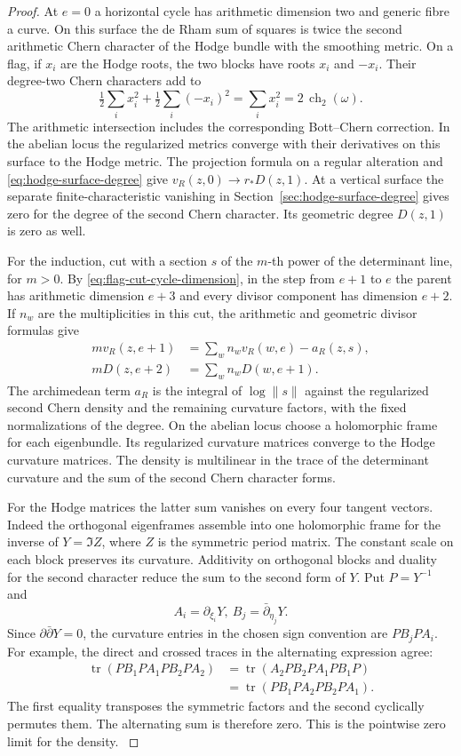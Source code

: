 \begin{proof}
At \(e=0\) a horizontal cycle has arithmetic dimension two and
generic fibre a curve. On this surface the de Rham sum of squares is
twice the second arithmetic Chern character of the
Hodge bundle with the smoothing metric. On a flag, if \(x_i\) are the Hodge roots, the two blocks have
roots \(x_i\) and \(-x_i\). Their degree-two Chern characters add to
\[
 \tfrac12\sum_i x_i^2+\tfrac12\sum_i(-x_i)^2
 =\sum_i x_i^2=2\,\operatorname{ch}_2(\omega).
\]
The arithmetic intersection includes the corresponding Bott--Chern correction. In the abelian locus the
regularized metrics converge with their derivatives on
this surface to the Hodge metric. The projection
formula on a regular alteration and
\eqref{eq:hodge-surface-degree} give
\(v_R(z,0)\to r_*D(z,1)\). At a vertical surface the
separate finite-characteristic vanishing in
Section~\ref{sec:hodge-surface-degree} gives zero for
the degree of the second Chern character. Its geometric
degree \(D(z,1)\) is zero as well.

For the induction, cut with a section \(s\) of the
\(m\)-th power of the determinant line, for \(m>0\).
By \eqref{eq:flag-cut-cycle-dimension}, in the step from \(e+1\) to \(e\) the parent has arithmetic
dimension \(e+3\) and every divisor component has dimension \(e+2\).
If \(n_w\) are the multiplicities in this cut,
the arithmetic and geometric divisor formulas give
\[
 \begin{split}
 m v_R(z,e+1)&=\sum_w n_w v_R(w,e)-a_R(z,s),\\
 m D(z,e+2)&=\sum_w n_w D(w,e+1).
 \end{split}
\]
The archimedean term \(a_R\) is the integral of
\(\log\|s\|\) against the regularized second Chern density
and the remaining curvature factors, with the fixed
normalizations of the degree. On the abelian locus choose a
holomorphic frame for each eigenbundle. Its regularized
curvature matrices converge to the Hodge curvature matrices.
The density is multilinear in the trace of the determinant
curvature and the sum of the second Chern character forms.

For the Hodge matrices the latter sum vanishes on every four
tangent vectors. Indeed the orthogonal eigenframes assemble into
one holomorphic frame for the inverse of \(Y=\Im Z\), where
\(Z\) is the symmetric period matrix. The constant scale on
each block preserves its curvature. Additivity on orthogonal
blocks and duality for the second character reduce the sum to
the second form of \(Y\). Put \(P=Y^{-1}\) and
\[
 A_i=\partial_{\xi_i}Y,\ B_j=\bar\partial_{\eta_j}Y.
\]
Since
\(\partial\bar\partial Y=0\), the curvature entries in the
chosen sign convention are \(P B_j P A_i\). For example, the direct and crossed traces in the alternating
expression agree:
\[
\begin{aligned}
 \operatorname{tr}(P B_1 P A_1 P B_2 P A_2)
 &=\operatorname{tr}(A_2 P B_2 P A_1 P B_1 P)\\
 &=\operatorname{tr}(P B_1 P A_2 P B_2 P A_1).
\end{aligned}
\]
The first equality transposes the symmetric factors and the
second cyclically permutes them. The alternating sum is
therefore zero. This is the pointwise zero limit for the
density.
\label{cor:covolume-flag-test-8}


\end{proof}
